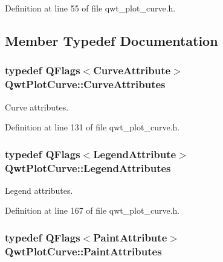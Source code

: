 Definition at line 55 of file qwt\-\_\-plot\-\_\-curve.\-h.



\subsection{Member Typedef Documentation}
\hypertarget{class_qwt_plot_curve_a43f465d035a5125d582768944287c70c}{
\subsubsection[{Curve\-Attributes}]{\setlength{\rightskip}{0pt plus 5cm}typedef Q\-Flags$<${\bf Curve\-Attribute}$>$ {\bf Qwt\-Plot\-Curve\-::\-Curve\-Attributes}}}\label{class_qwt_plot_curve_a43f465d035a5125d582768944287c70c}


Curve attributes. 



Definition at line 131 of file qwt\-\_\-plot\-\_\-curve.\-h.

\hypertarget{class_qwt_plot_curve_aa9b27e27ddc27466eed70485e690daa6}{
\subsubsection[{Legend\-Attributes}]{\setlength{\rightskip}{0pt plus 5cm}typedef Q\-Flags$<${\bf Legend\-Attribute}$>$ {\bf Qwt\-Plot\-Curve\-::\-Legend\-Attributes}}}\label{class_qwt_plot_curve_aa9b27e27ddc27466eed70485e690daa6}


Legend attributes. 



Definition at line 167 of file qwt\-\_\-plot\-\_\-curve.\-h.

\hypertarget{class_qwt_plot_curve_a39ba40485087294c775a367d859b6237}{
\subsubsection[{Paint\-Attributes}]{\setlength{\rightskip}{0pt plus 5cm}typedef Q\-Flags$<${\bf Paint\-Attribute}$>$ {\bf Qwt\-Plot\-Curve\-::\-Paint\-Attributes}}}\label{class_qwt_plot_curve_a39ba40485087294c775a367d859b6237}


